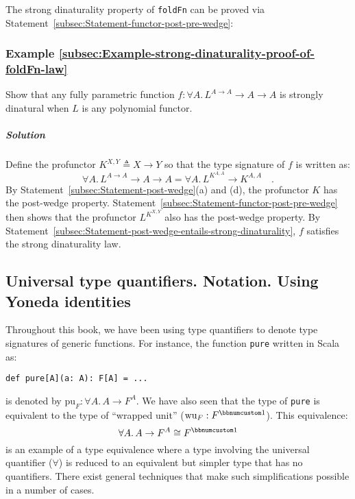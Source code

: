 The strong dinaturality property of \lstinline!foldFn! can be proved
via Statement~\ref{subsec:Statement-functor-post-pre-wedge}:

\subsubsection{Example \label{subsec:Example-strong-dinaturality-proof-of-foldFn-law}\ref{subsec:Example-strong-dinaturality-proof-of-foldFn-law}}

Show that any fully parametric function $f:\forall A.\,L^{A\rightarrow A}\rightarrow A\rightarrow A$
is strongly dinatural when $L$ is any polynomial functor.

\subparagraph{Solution}

Define the profunctor $K^{X,Y}\triangleq X\rightarrow Y$ so that
the type signature of $f$ is written as:
\[
\forall A.\,L^{A\rightarrow A}\rightarrow A\rightarrow A=\forall A.\,L^{K^{A,A}}\rightarrow K^{A,A}\quad.
\]
By Statement~\ref{subsec:Statement-post-wedge}(a) and (d), the profunctor
$K$ has the post-wedge property. Statement~\ref{subsec:Statement-functor-post-pre-wedge}
then shows that the profunctor $L^{K^{X,Y}}$ also has the post-wedge
property. By Statement~\ref{subsec:Statement-post-wedge-entails-strong-dinaturality},
$f$ satisfies the strong dinaturality law. 

\subsection{Universal type quantifiers. Notation. Using Yoneda identities}

Throughout this book, we have been using type quantifiers to denote
type signatures of generic functions. For instance, the function \lstinline!pure!
written in Scala as:
\begin{lstlisting}
def pure[A](a: A): F[A] = ...
\end{lstlisting}
is denoted by $\text{pu}_{F}:\forall A.\,A\rightarrow F^{A}$. We
have also seen that the type of \lstinline!pure! is equivalent to
the type of \textsf{``}wrapped unit\textsf{''} ($\text{wu}_{F}:F^{\bbnum 1}$). This
equivalence:
\[
\forall A.\,A\rightarrow F^{A}\cong F^{\bbnum 1}
\]
is an example of a type equivalence where a type involving the universal
quantifier ($\forall$) is reduced to an equivalent but simpler type
that has no quantifiers. There exist general techniques that make
such simplifications possible in a number of cases.

